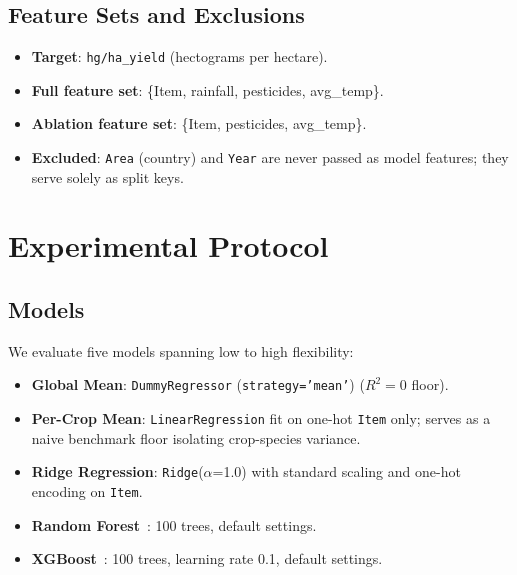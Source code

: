 \documentclass[conference]{IEEEtran}
\begin{document}
\subsection{Feature Sets and Exclusions}

\begin{itemize}
    \item \textbf{Target}: \texttt{hg/ha\_yield} (hectograms per hectare).
    \item \textbf{Full feature set}: \{Item, rainfall, pesticides, avg\_temp\}.
    \item \textbf{Ablation feature set}: \{Item, pesticides, avg\_temp\}.
    \item \textbf{Excluded}: \texttt{Area} (country) and \texttt{Year} are 
          never passed as model features; they serve solely as split keys.
\end{itemize}

\section{Experimental Protocol}
\label{sec:protocol}

\subsection{Models}

We evaluate five models spanning low to high flexibility:

\begin{itemize}
    \item \textbf{Global Mean}: \texttt{DummyRegressor} (\texttt{strategy='mean'}) ($R^2 = 0$ floor).
    
    \item \textbf{Per-Crop Mean}: \texttt{LinearRegression} fit on one-hot \texttt{Item} 
    only; serves as a naive benchmark floor isolating crop-species variance.
    
    \item \textbf{Ridge Regression}: \texttt{Ridge}($\alpha$=1.0) with standard scaling 
    and one-hot encoding on \texttt{Item}.
    
    \item \textbf{Random Forest}~\cite{breiman2001}: 100 trees, default settings.
    
    \item \textbf{XGBoost}~\cite{chen2016xgboost}: 100 trees, learning rate 0.1, default settings.
\end{itemize}
\end{document}
